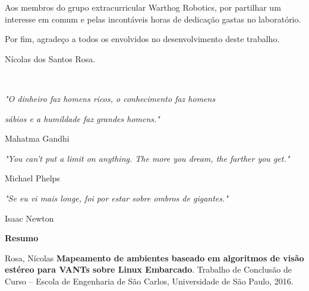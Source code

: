 Aos membros do grupo extracurricular Warthog Robotics, por partilhar um interesse em comum e pelas incontáveis horas de dedicação gastas no laboratório.

Por fim, agradeço a todos os envolvidos no desenvolvimento deste trabalho.

\begin{flushright}
Nícolas dos Santos Rosa.
\end{flushright}


\cleardoublepage

\
\vspace{0.76\textheight} 

\begin{flushright}

\textit{"O dinheiro faz homens ricos, o conhecimento faz homens }

\textit{sábios e a humildade faz grandes homens."}

Mahatma Gandhi

\textit{"You can't put a limit on anything. The more you dream, the farther you get."}

Michael Phelps

\textit{"Se eu vi mais longe, foi por estar sobre ombros de gigantes."}

Isaac Newton

\end{flushright}


\cleardoublepage

\vspace{0.11\textheight} 

\begin{center}
\textbf{\Huge{Resumo}}
\end{center}

\vspace{0.05\textheight}

Rosa, Nícolas \textbf{Mapeamento de ambientes baseado em algoritmos de visão estéreo para VANTs sobre Linux Embarcado}. Trabalho de Conclusão de Curso -- Escola de Engenharia de São Carlos, Universidade de São Paulo, 2016.

\vspace{0.05\textheight}


